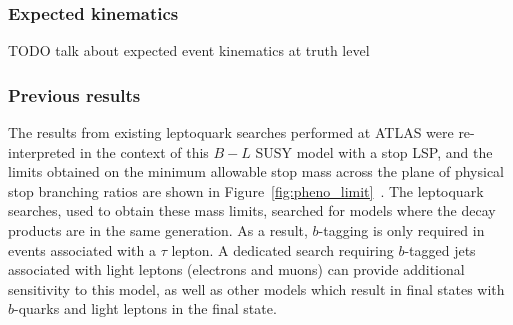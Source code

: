 \subsubsection{Expected kinematics}

{\color{red} TODO talk about expected event kinematics at truth level}

\FloatBarrier
\subsubsection{Previous results}

The results from existing leptoquark searches performed at ATLAS were
re-interpreted in the context of this $B-L$ SUSY model with a stop LSP, and the
limits obtained on the minimum allowable stop mass across the plane of
physical stop branching ratios are shown in
Figure~\ref{fig:pheno_limit}~\cite{Marshall:2014cwa,Marshall:2014kea}.
The leptoquark searches, used to obtain these mass limits, searched for
models where the decay products are in the same generation.
As a result, $b$-tagging is only required in events associated with a $\tau$
lepton.
A dedicated search requiring $b$-tagged jets associated with light leptons
(electrons and muons) can provide additional sensitivity to this model, as
well as other models which result in final states with $b$-quarks and light
leptons in the final state.

\begin{figure}[p]
\end{figure}

